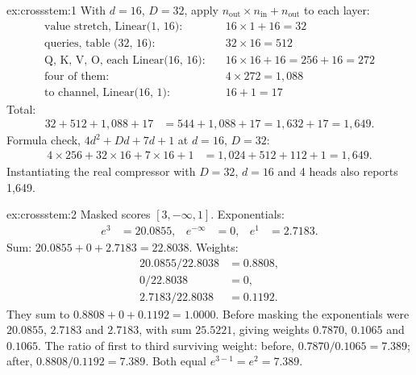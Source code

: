
\begin{solution}{ex:crossstem:1}
With $d = 16$, $D = 32$, apply $n_{\text{out}}\times n_{\text{in}} + n_{\text{out}}$ to each layer:
\begin{align*}
  \text{value stretch, Linear(1, 16)}:&\quad 16\times1 + 16 = 32\\
  \text{queries, table (32, 16)}:&\quad 32\times16 = 512\\
  \text{Q, K, V, O, each Linear(16, 16)}:&\quad 16\times16 + 16 = 256 + 16 = 272\\
  \text{four of them}:&\quad 4\times272 = 1{,}088\\
  \text{to channel, Linear(16, 1)}:&\quad 16 + 1 = 17
\end{align*}
Total:
\begin{align*}
  32 + 512 + 1{,}088 + 17 &= 544 + 1{,}088 + 17 = 1{,}632 + 17 = 1{,}649 .
\end{align*}
Formula check, $4d^2 + Dd + 7d + 1$ at $d = 16$, $D = 32$:
\begin{align*}
  4\times256 + 32\times16 + 7\times16 + 1 &= 1{,}024 + 512 + 112 + 1 = 1{,}649 .
\end{align*}
Instantiating the real compressor with $D = 32$, $d = 16$ and 4 heads also reports 1,649.
\end{solution}

\begin{solution}{ex:crossstem:2}
Masked scores $[3, -\infty, 1]$. Exponentials:
\begin{align*}
  e^{3} &= 20.0855, & e^{-\infty} &= 0, & e^{1} &= 2.7183 .
\end{align*}
Sum: $20.0855 + 0 + 2.7183 = 22.8038$. Weights:
\begin{align*}
  20.0855/22.8038 &= 0.8808,\\
  0/22.8038 &= 0,\\
  2.7183/22.8038 &= 0.1192 .
\end{align*}
They sum to $0.8808 + 0 + 0.1192 = 1.0000$. Before masking the exponentials were $20.0855$, $2.7183$ and $2.7183$, with sum $25.5221$, giving weights $0.7870$, $0.1065$ and $0.1065$. The ratio of first to third surviving weight: before, $0.7870/0.1065 = 7.389$; after, $0.8808/0.1192 = 7.389$. Both equal $e^{3-1} = e^2 = 7.389$.
\end{solution}

